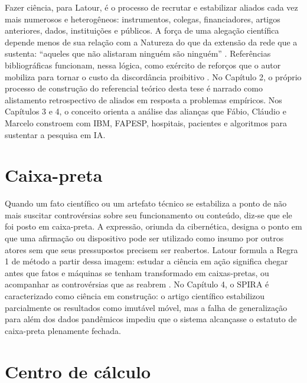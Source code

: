 \begin{description}
Fazer ciência, para Latour, é o processo de recrutar e estabilizar aliados cada vez mais numerosos e heterogêneos: instrumentos, colegas, financiadores, artigos anteriores, dados, instituições e públicos. A força de uma alegação científica depende menos de sua relação com a Natureza do que da extensão da rede que a sustenta: ``aqueles que não alistaram ninguém são ninguém'' \parencite[p.~239]{Latour2011CienciaEmAcao}. Referências bibliográficas funcionam, nessa lógica, como exército de reforços que o autor mobiliza para tornar o custo da discordância proibitivo \parencite[p.~53]{Latour2011CienciaEmAcao}. No Capítulo 2, o próprio processo de construção do referencial teórico desta tese é narrado como alistamento retrospectivo de aliados em resposta a problemas empíricos. Nos Capítulos 3 e 4, o conceito orienta a análise das alianças que Fábio, Cláudio e Marcelo constroem com IBM, FAPESP, hospitais, pacientes e algoritmos para sustentar a pesquisa em IA.

\bigskip

\section*{Caixa-preta}

Quando um fato científico ou um artefato técnico se estabiliza a ponto de não mais suscitar controvérsias sobre seu funcionamento ou conteúdo, diz-se que ele foi posto em caixa-preta. A expressão, oriunda da cibernética, designa o ponto em que uma afirmação ou dispositivo pode ser utilizado como insumo por outros atores sem que seus pressupostos precisem ser reabertos. Latour formula a Regra 1 de método a partir dessa imagem: estudar a ciência em ação significa chegar antes que fatos e máquinas se tenham transformado em caixas-pretas, ou acompanhar as controvérsias que as reabrem \parencite[p.~420]{Latour2011CienciaEmAcao}. No Capítulo 4, o SPIRA é caracterizado como ciência em construção: o artigo científico estabilizou parcialmente os resultados como imutável móvel, mas a falha de generalização para além dos dados pandêmicos impediu que o sistema alcançasse o estatuto de caixa-preta plenamente fechada.

\bigskip

\section*{Centro de cálculo}


\end{description}
